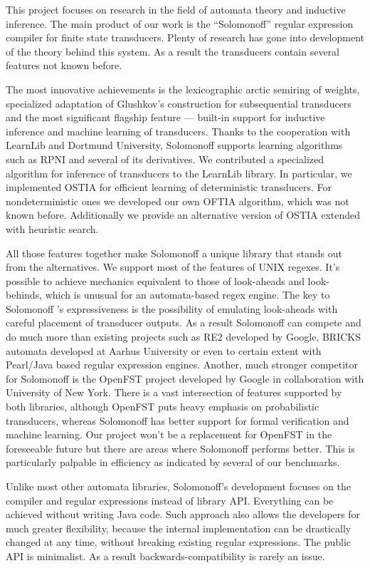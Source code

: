 
This project focuses on research in the field of automata theory and inductive inference.  The main product of our work is the ``Solomonoff'' regular expression compiler for finite state transducers. Plenty of research has gone into development of the theory behind this system. As a result the transducers contain several features not known before. 

The most innovative achievements is the lexicographic arctic semiring of weights\cite{MendozaDrosik2020MultitapeAA}, specialized adaptation of Glushkov's construction for subsequential transducers and the most significant flagship feature --- built-in support for inductive inference and machine learning of transducers. Thanks to the cooperation with LearnLib and Dortmund University, Solomonoff supports learning algorithms such as RPNI and several of its  derivatives. We contributed a specialized algorithm for inference of transducers to the LearnLib library. In particular, we implemented OSTIA for efficient learning of deterministic transducers. For nondeterministic ones we developed our own OFTIA algorithm, which was not known before. Additionally we provide an alternative version of OSTIA extended with heuristic search.

All those features together make Solomonoff a unique library that stands out from the alternatives. We support most of the features of UNIX regexes. It's possible to achieve mechanics equivalent to those of look-aheads and look-behinds, which is unusual for an automata-based regex engine. The key to Solomonoff 's expressiveness is the possibility of emulating look-aheads with careful placement of transducer outputs. As a result Solomonoff can compete and  do much more than existing projects such as RE2 developed by Google, BRICKS automata developed at Aarhus University or even to certain extent with Pearl/Java based regular expression engines. Another, much stronger competitor for Solomonoff is the OpenFST project developed by Google in collaboration with University of New York. There is a vast intersection of features supported by both libraries, although OpenFST puts heavy emphasis on probabilistic transducers, whereas Solomonoff has better support for formal verification and machine learning. Our project won't be a replacement for OpenFST in the foreseeable future but there are areas where Solomonoff performs better. This is particularly palpable in efficiency as indicated by several of our benchmarks.

Unlike most other automata libraries, Solomonoff's development focuses on the compiler and regular expressions instead of library API. Everything can be achieved without writing Java code. Such approach also allows the developers for much greater flexibility, because the internal implementation can be drastically changed at any time, without breaking existing regular expressions. The public API is minimalist. As a result backwards-compatibility is rarely an issue.  

